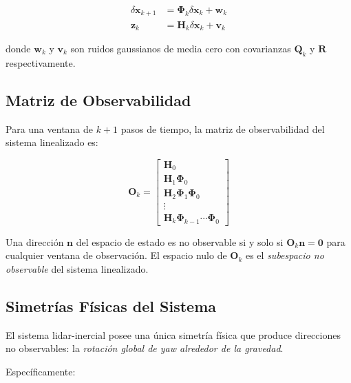 \begin{align}
\delta\mathbf{x}_{k+1} &= \boldsymbol{\Phi}_k \delta\mathbf{x}_k + \mathbf{w}_k \\
\mathbf{z}_k &= \mathbf{H}_k \delta\mathbf{x}_k + \mathbf{v}_k
\end{align}

donde $\mathbf{w}_k$ y $\mathbf{v}_k$ son ruidos gaussianos de media cero con
covarianzas $\mathbf{Q}_k$ y $\mathbf{R}$ respectivamente.

\subsection{Matriz de Observabilidad}
\label{sec:fej-matriz-observabilidad}

Para una ventana de $k+1$ pasos de tiempo, la matriz de observabilidad del
sistema linealizado es:

\begin{equation}
\mathbf{O}_k =
\begin{bmatrix}
\mathbf{H}_0 \\
\mathbf{H}_1 \boldsymbol{\Phi}_0 \\
\mathbf{H}_2 \boldsymbol{\Phi}_1 \boldsymbol{\Phi}_0 \\
\vdots \\
\mathbf{H}_k \boldsymbol{\Phi}_{k-1} \cdots \boldsymbol{\Phi}_0
\end{bmatrix}
\label{eq:obs-matrix}
\end{equation}

Una dirección $\mathbf{n}$ del espacio de estado es no observable si y solo si
$\mathbf{O}_k \mathbf{n} = \mathbf{0}$ para cualquier ventana de observación.
El espacio nulo de $\mathbf{O}_k$ es el \emph{subespacio no observable} del
sistema linealizado.

\subsection{Simetrías Físicas del Sistema}
\label{sec:fej-simetrias}

El sistema \gls{lidar}-inercial posee una única simetría física que produce
direcciones no observables: la \emph{rotación global de yaw alrededor de la
gravedad}.

Específicamente:

